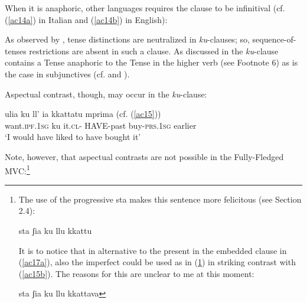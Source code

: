 \documentclass[output=paper]{langscibook}
\begin{document}
When it is anaphoric, other languages requires the clause to be infinitival (cf. (\ref{ac14a}) in Italian and (\ref{ac14b}) in English):

\ea \label{ac14}
    \z
\z

As observed by \citet{calabrese1993a}, tense distinctions are neutralized in \textit{ku}-clauses; so, sequence-of-tenses restrictions are absent in such a clause.  As discussed in \citet{calabrese1993a} the \textit{ku}-clause contains a Tense anaphoric to the Tense in the higher verb (see Footnote 6) as is the case in subjunctives (cf. \citealt[46–48]{calabrese1993a} and \citealt[652]{manzini2005a}).

\ea \label{ac15}
    \z
\z

Aspectual contrast, though, may occur in the \textit{ku}-clause:

\ea \label{ac16}
\gll ulia         ku  ll’   ia    kkattatu     mprima  (cf. (\ref{ac15}))\\
     want.\textsc{ipf}.\textsc{1sg} ku  it.\textsc{cl}- HAVE-past buy-\textsc{prs}.\textsc{1sg} earlier\\
 \glt ‘I would have liked to have bought it’
\z

Note, however, that aspectual contrasts are not possible in the Fully-Fledged MVC:\footnote{The use of the progressive sta makes this sentence more felicitous (see Section 2.4):

\ea \label{fn7ex} {sta ʃia ku llu kkattu}
\z

It is to notice that in alternative to the present in the embedded clause in (\ref{ac17a}), also the imperfect could be used as in (\ref{fn7ex2}) in striking contrast with (\ref{ac15b}). The reasons for this are unclear to me at this moment:

\ea \label{fn7ex2}{sta ʃia ku llu kkattava}
\z}
\end{document}

